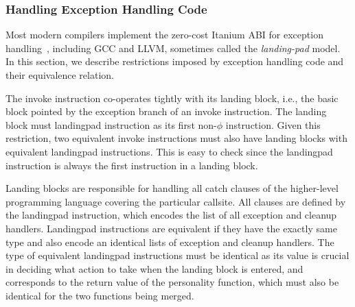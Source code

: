 \subsubsection{Handling Exception Handling Code}

Most modern compilers implement the zero-cost Itanium ABI for exception
handling~\cite{dinechin00}, including GCC and LLVM, sometimes called the
\textit{landing-pad} model. In this section, we describe restrictions imposed
by exception handling code and their equivalence relation.

The invoke instruction co-operates tightly with its landing block, i.e., the
basic block pointed by the exception branch of an invoke instruction.
The landing block must landingpad instruction as its first non-$\phi$
instruction.
Given this restriction, two equivalent invoke instructions must also have
landing blocks with equivalent landingpad instructions.
This is easy to check since the landingpad instruction is always the first
instruction in a landing block. 

Landing blocks are responsible for handling all catch clauses of the
higher-level programming language covering the particular callsite.
All clauses are defined by the landingpad instruction, which encodes the list of
all exception and cleanup handlers.
Landingpad instructions are equivalent if they have the exactly same type and
also encode an identical lists of exception and cleanup handlers.
The type of equivalent landingpad instructions must be identical as its value
is crucial in deciding what action to take when the landing block is entered,
and corresponds to the return value of the personality function, which must also
be identical for the two functions being merged.



